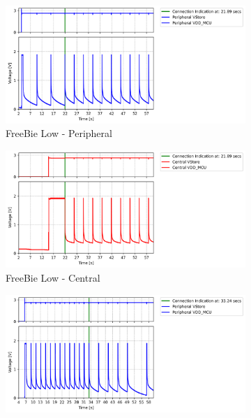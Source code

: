 \begin{figure}[t]
    \begin{subfigure}{0.5\linewidth}
        \centering
        \includegraphics[width=1\linewidth]{chapters/Results/Connection_FreeBie_low_peripheral.png}
        \caption{\scriptsize{FreeBie Low - Peripheral}}
        \vspace{1\baselineskip}
    \end{subfigure}\hfill
    \begin{subfigure}{0.5\linewidth}
        \centering
        \includegraphics[width=1\linewidth]{chapters/Results/Connection_FreeBie_low_central.png}
        \caption{\scriptsize{FreeBie Low - Central}}
        \vspace{1\baselineskip}
    \end{subfigure}
    \begin{subfigure}{0.5\linewidth}
        \centering
        \includegraphics[width=1\linewidth]{chapters/Results/Connection_FreeBie_medium_peripheral.png}

\end{subfigure}
\end{figure}

